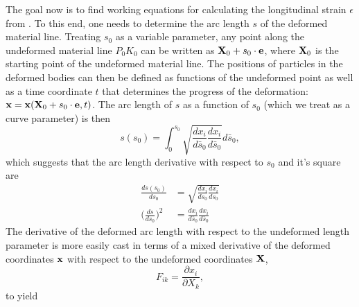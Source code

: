 The goal now is to find working equations for calculating the longitudinal strain $\epsilon$ from . 
To this end, one needs to determine the arc length $s$ of the deformed material line. 
Treating $s_0$ as a variable parameter, any point along the undeformed material line $P_{0}K_{0}$ can be
written as ${\mathbf X}_{0} + s_0 \cdot {\mathbf e}$, where ${\mathbf X}_0$ is the starting point of the undeformed material line. The positions
of particles in the deformed bodies can then be defined as functions of the undeformed point as well as a time
coordinate $t$ that determines the progress of the deformation: ${\mathbf x} = {\mathbf x}({\mathbf X}_{0} + s_0 \cdot{\mathbf e}, t)$.
The arc length of $s$ as a function of $s_0$ (which we treat as a curve parameter) is then  
\begin{equation}
\label{eq:arclen}
s(s_0) = \int_0^{s_0}\sqrt{\frac{dx_i}{d\bar{s}_0}\frac{dx_i}{d\bar{s}_0}}d\bar{s}_0, 
\end{equation}
which suggests that the arc length derivative with respect to $s_0$ and it's square are
\begin{equation}
\label{eq:dsds0}
  \begin{split}
    \frac{ds(s_0)}{ds_0} &= \sqrt{\frac{dx_i}{ds_0}\frac{dx_i}{ds_0}} \\
     \bigg(\frac{ds}{ds_0}\bigg)^2 &= \frac{dx_i}{d\bar{s}_0}\frac{dx_i}{d\bar{s}_0}
  \end{split}
\end{equation}
The derivative of the deformed arc length with respect to the undeformed length parameter is more easily cast in
terms of a mixed derivative of the deformed coordinates ${\mathbf x}$ with respect to the undeformed coordinates ${\mathbf X}$,
\begin{equation} 
\label{eq:dGrad}
  F_{ik} = \frac{\partial x_{i}}{\partial X_{k}},
\end{equation}
to yield 
% 
% 
